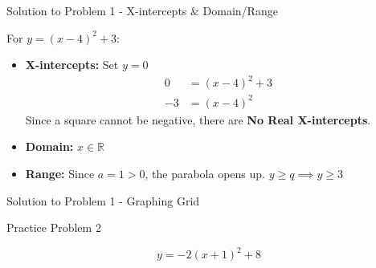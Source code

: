 \documentclass[aspectratio=169]{beamer}
\begin{document}
\begin{frame}{Solution to Problem 1 - X-intercepts & Domain/Range}
    \begin{tcolorbox}[colback=lightgray,colframe=accent,title=Solution 1 (Cont.)]
        \footnotesize
        For $y = (x-4)^2 + 3$:
        \begin{itemize}
            \item \textbf{X-intercepts:} Set $y=0$
                \begin{align*}
                    0 &= (x-4)^2 + 3 \\
                    -3 &= (x-4)^2
                \end{align*}
                Since a square cannot be negative, there are \textbf{No Real X-intercepts}.
            \item \textbf{Domain:} $x \in \mathbb{R}$
            \item \textbf{Range:} Since $a=1>0$, the parabola opens up. $y \geq q \implies y \geq 3$
        \end{itemize}
    \end{tcolorbox}
\end{frame}

\begin{frame}{Solution to Problem 1 - Graphing Grid}
    \centering
\end{frame}

\begin{frame}{Practice Problem 2}
    \begin{tcolorbox}[colback=lightgray,colframe=primary,title=Problem 2]
        \footnotesize
        \[ y = -2(x+1)^2 + 8 \]
    \end{tcolorbox}
\end{frame}
\end{document}
